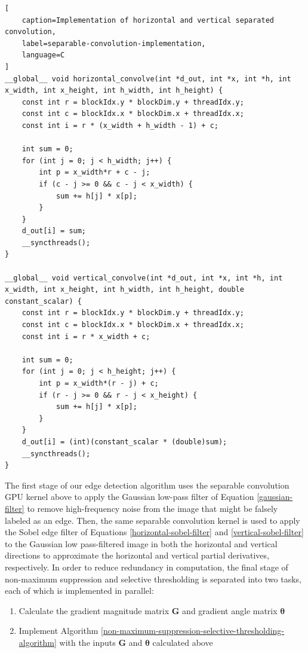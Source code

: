 \documentclass[journal]{IEEEtran}
\begin{document}
\begin{lstlisting}[
	caption=Implementation of horizontal and vertical separated convolution,
	label=separable-convolution-implementation,
	language=C
]
__global__ void horizontal_convolve(int *d_out, int *x, int *h, int x_width, int x_height, int h_width, int h_height) {
    const int r = blockIdx.y * blockDim.y + threadIdx.y;
    const int c = blockIdx.x * blockDim.x + threadIdx.x;
    const int i = r * (x_width + h_width - 1) + c;
    
    int sum = 0;
    for (int j = 0; j < h_width; j++) {
        int p = x_width*r + c - j;
        if (c - j >= 0 && c - j < x_width) {
            sum += h[j] * x[p];
        }
    }
    d_out[i] = sum;
    __syncthreads();
}

__global__ void vertical_convolve(int *d_out, int *x, int *h, int x_width, int x_height, int h_width, int h_height, double constant_scalar) {
	const int r = blockIdx.y * blockDim.y + threadIdx.y;
	const int c = blockIdx.x * blockDim.x + threadIdx.x;
	const int i = r * x_width + c;

    int sum = 0;
    for (int j = 0; j < h_height; j++) {
        int p = x_width*(r - j) + c;
        if (r - j >= 0 && r - j < x_height) {
            sum += h[j] * x[p];
        }
    }
    d_out[i] = (int)(constant_scalar * (double)sum);
    __syncthreads();
}
\end{lstlisting}
\par The first stage of our edge detection algorithm uses the separable convolution GPU kernel above to apply the Gaussian low-pass filter of Equation \ref{gaussian-filter} to remove high-frequency noise from the image that might be falsely labeled as an edge. Then, the same separable convolution kernel is used to apply the Sobel edge filter of Equations \ref{horizontal-sobel-filter} and \ref{vertical-sobel-filter} to the Gaussian low pass-filtered image in both the horizontal and vertical directions to approximate the horizontal and vertical partial derivatives, respectively. In order to reduce redundancy in computation, the final stage of non-maximum suppression and selective thresholding is separated into two tasks, each of which is implemented in parallel:
\begin{enumerate}
	\item Calculate the gradient magnitude matrix $\boldsymbol{G}$ and gradient angle matrix $\boldsymbol{\theta}$
	\item Implement Algorithm \ref{non-maximum-suppression-selective-thresholding-algorithm} with the inputs $\boldsymbol{G}$ and $\boldsymbol{\theta}$ calculated above
\end{enumerate}
\end{document}
